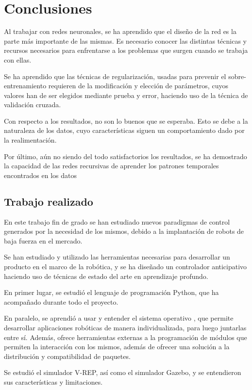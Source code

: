 \chapter{Conclusiones}
Al trabajar con redes neuronales, se ha aprendido que el diseño de la red es la parte más importante de las mismas. Es necesario conocer las distintas técnicas y recursos necesarios para enfrentarse a los problemas que surgen cuando se trabaja con ellas.

Se ha aprendido que las técnicas de regularización, usadas para prevenir el sobre-entrenamiento requieren de la modificación y elección de parámetros, cuyos valores han de ser elegidos mediante prueba y error, haciendo uso de la técnica de validación cruzada.

Con respecto a los resultados, no son lo buenos que se esperaba. Esto se debe a la naturaleza de los datos, cuyo características siguen un comportamiento dado por la realimentación.

Por último, aún no siendo del todo satisfactorios los resultados, se ha demostrado la capacidad de las redes recursivas de aprender los patrones temporales encontrados en los datos

\section{Trabajo realizado}
En este trabajo fin de grado se han estudiado nuevos paradigmas de control generados por la necesidad de los mismos, debido a la implantación de robots de baja fuerza en el mercado.

Se han estudiado y utilizado las herramientas necesarias para desarrollar un producto en el marco de la robótica, y se ha diseñado un controlador anticipativo haciendo uso de técnicas de estado del arte en aprendizaje profundo.

En primer lugar, se estudió el lenguaje de programación Python, que ha acompañado durante todo el proyecto.

En paralelo, se aprendió a usar y entender el sistema operativo \ros, que permite desarrollar aplicaciones robóticas de manera individualizada, para luego juntarlas entre sí. Además, ofrece herramientas externas a la programación de módulos que permiten la interacción con los mismos, además de ofrecer una solución a la distribución y compatibilidad de paquetes.

Se estudió el simulador V-REP, así como el simulador Gazebo, y se entendieron sus características y limitaciones.


